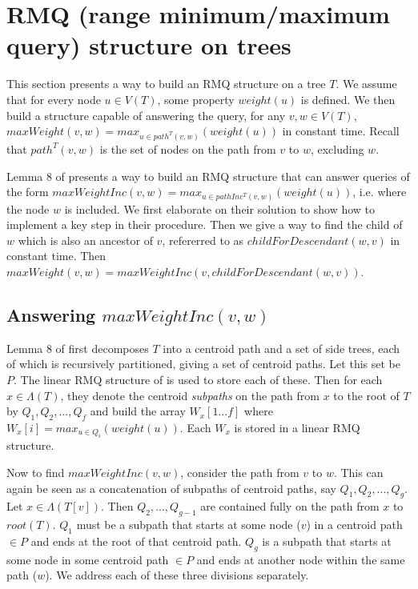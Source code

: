 \documentclass{article}
\newcommand{\leafset}{\Lambda}
\begin{document}
    \section{RMQ (range minimum/maximum query) structure on trees}
    \label{sec:rmqstructure}

    This section presents a way to build an RMQ structure on a tree $T$. We assume that for every node $u \in V(T)$, some property $weight(u)$ is defined. We then build a structure capable of answering the query, for any $v, w \in V(T)$, $maxWeight(v, w) = max_{u \in path^{T}(v, w)}(weight(u))$ in constant time. Recall that $path^{T}(v, w)$ is the set of nodes on the path from $v$ to $w$, excluding $w$.

    Lemma 8 of \cite{jansson2018algorithms} presents a way to build an RMQ structure that can answer queries of the form $maxWeightInc(v, w) = max_{u \in pathInc^{T}(v, w)}(weight(u))$, i.e. where the node $w$ is included. We first elaborate on their solution to show how to implement a key step in their procedure. Then we give a way to find the child of $w$ which is also an ancestor of $v$, refererred to as $childForDescendant(w, v)$ in constant time. Then $maxWeight(v, w) = maxWeightInc(v, childForDescendant(w, v))$.

    \subsection{Answering $maxWeightInc(v, w)$}
    \label{subsec:answeringmaxweightinc}

    Lemma 8 of \cite{jansson2018algorithms} first decomposes $T$ into a centroid path and a set of side trees, each of which is recursively partitioned, giving a set of centroid paths. Let this set be $P$. The linear RMQ structure of \cite{bender2000lca} is used to store each of these. Then for each $x \in \leafset(T)$, they denote the centroid \textit{subpaths} on the path from $x$ to the root of $T$ by $Q_1, Q_2, ..., Q_f$ and build the array $W_x[1 ... f]$ where $W_x[i] = max_{u \in Q_i}(weight(u))$. Each $W_x$ is stored in a linear RMQ structure.

    Now to find $maxWeightInc(v, w)$, consider the path from $v$ to $w$. This can again be seen as a concatenation of subpaths of centroid paths, say $Q_1, Q_2, ..., Q_g$. Let $x \in \leafset(T[v])$. Then $Q_2, ..., Q_{g - 1}$ are contained fully on the path from $x$ to $root(T)$. $Q_1$ must be a subpath that starts at some node ($v$) in a centroid path $\in P$ and ends at the root of that centroid path. $Q_g$ is a subpath that starts at some node in some centroid path $\in P$ and ends at another node within the same path ($w$). We address each of these three divisions separately.
\end{document}
